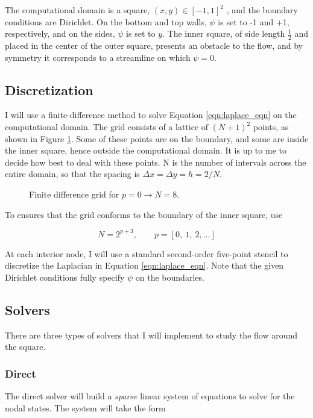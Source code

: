     The computational domain is a square, $(x, y) \in [-1, 1]^2$ , and the boundary conditions are Dirichlet. On the bottom and top walls, $\psi$ is set to -1 and +1, respectively, and on the sides, $\psi$ is set to $y$. The inner square, of side length $\frac{1}{2}$ and placed in the center of the outer square, presents an obstacle to the flow, and by symmetry it corresponds to a streamline on which $\psi = 0$.


    \pagebreak
    \subsection{Discretization}
    I will use a finite-difference method to solve Equation \ref{eqn:laplace_eqn} on the computational domain. The grid consists of a lattice of $(N + 1)^2$ points, as shown in Figure \ref{fig:fea_grid}. Some of these points are on the boundary, and some are inside the inner square, hence outside the computational domain. It is up to me to decide how best to deal with these points. N is the number of intervals across the entire domain, so that the spacing is $\Delta x = \Delta y = h = 2/N$.

    \begin{figure}[h]
        \centering
        
        \caption[Finite Difference Grid]{Finite difference grid for $p=0 \rightarrow N=8$.}
        \label{fig:fea_grid}
    \end{figure}


    To ensures that the grid conforms to the boundary of the inner square, use

    \begin{equation}
        N = 2^{p+3},\qquad p = [0,\ 1,\ 2,\ldots]
    \end{equation}

    At each interior node, I will use a standard second-order five-point stencil to discretize the Laplacian in Equation \ref{eqn:laplace_eqn}. Note that the given Dirichlet conditions fully specify $\psi$ on the boundaries.

    
    \subsection{Solvers}
    There are three types of solvers that I will implement to study the flow around the square.

        \subsubsection{Direct}
        The direct solver will build a \textit{sparse} linear system of equations to solve for the nodal states. The system
        will take the form

